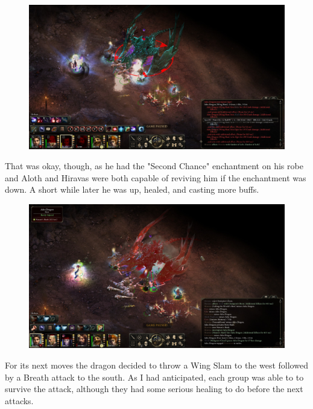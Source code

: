 \documentclass{article}
\begin{document}
\begin{figure}
\includegraphics[scale=0.33]{files/blog/2019_03_17_pillars_of_eternity_path_of_the_damned_act_iv/2019_03_17_dragon2_08.jpg}
\end{figure}

That was okay, though, as he had the "Second Chance" enchantment on his robe and Aloth and Hiravas were both capable of reviving him if the enchantment was down.  A short while later he was up, healed, and casting more buffs.

\begin{figure}
\includegraphics[scale=0.33]{files/blog/2019_03_17_pillars_of_eternity_path_of_the_damned_act_iv/2019_03_17_dragon2_09.jpg}
\end{figure}

For its next moves the dragon decided to throw a Wing Slam to the west followed by a Breath attack to the south.  As I had anticipated, each group was able to to survive the attack, although they had some serious healing to do before the next attacks.
\end{document}
